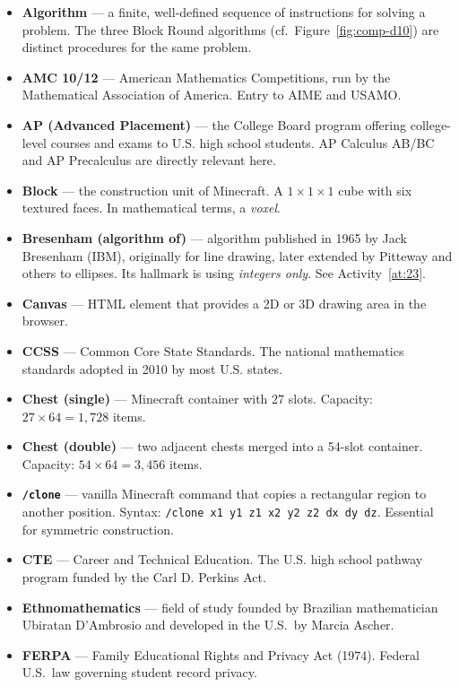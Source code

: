 \documentclass[12pt,a4paper]{scrartcl}
\newcommand{\code}[1]{\texttt{\small #1}}
\newcommand{\acc}[1]{\textcolor{accent}{\textbf{#1}}}
\newcommand{\cmd}[1]{\textcolor{earth}{\texttt{\small #1}}}
\begin{document}
\begin{itemize}[leftmargin=1.4em,itemsep=0.3em,topsep=0.3em]
  \item \acc{Algorithm} --- a finite, well-defined sequence of instructions for solving a problem. The three Block Round algorithms (cf.\ Figure~\ref{fig:comp-d10}) are distinct procedures for the same problem.
  \item \acc{AMC 10/12} --- American Mathematics Competitions, run by the Mathematical Association of America. Entry to AIME and USAMO.
  \item \acc{AP (Advanced Placement)} --- the College Board program offering college-level courses and exams to U.S. high school students. AP Calculus AB/BC and AP Precalculus are directly relevant here.
  \item \acc{Block} --- the construction unit of Minecraft. A $1\times1\times1$ cube with six textured faces. In mathematical terms, a \emph{voxel}.
  \item \acc{Bresenham (algorithm of)} --- algorithm published in 1965 by Jack Bresenham (IBM), originally for line drawing, later extended by Pitteway and others to ellipses. Its hallmark is using \emph{integers only}. See Activity~\ref{at:23}.
  \item \acc{Canvas} --- HTML element that provides a 2D or 3D drawing area in the browser.
  \item \acc{CCSS} --- Common Core State Standards. The national mathematics standards adopted in 2010 by most U.S. states.
  \item \acc{Chest (single)} --- Minecraft container with 27 slots. Capacity: $27 \times 64 = 1{,}728$ items.
  \item \acc{Chest (double)} --- two adjacent chests merged into a 54-slot container. Capacity: $54 \times 64 = 3{,}456$ items.
  \item \acc{\code{/clone}} --- vanilla Minecraft command that copies a rectangular region to another position. Syntax: \cmd{/clone x1 y1 z1 x2 y2 z2 dx dy dz}. Essential for symmetric construction.
  \item \acc{CTE} --- Career and Technical Education. The U.S. high school pathway program funded by the Carl D. Perkins Act.
  \item \acc{Ethnomathematics} --- field of study founded by Brazilian mathematician Ubiratan D'Ambrosio and developed in the U.S.\ by Marcia Ascher.
  \item \acc{FERPA} --- Family Educational Rights and Privacy Act (1974). Federal U.S.\ law governing student record privacy.

\end{itemize}
\end{document}
